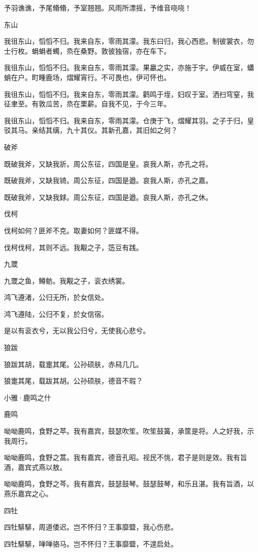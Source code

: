 予羽谯谯，予尾翛翛，予室翘翘。风雨所漂摇，予维音哓哓！

东山

我徂东山，慆慆不归。我来自东，零雨其濛。我东曰归，我心西悲。制彼裳衣，勿士行枚。蜎蜎者蠋，烝在桑野。敦彼独宿，亦在车下。

我徂东山，慆慆不归。我来自东，零雨其濛。果臝之实，亦施于宇。伊威在室，蠨蛸在户。町畽鹿场，熠耀宵行。不可畏也，伊可怀也。

我徂东山，慆慆不归。我来自东，零雨其濛。鹳鸣于垤，妇叹于室。洒扫穹窒，我征聿至。有敦瓜苦，烝在栗薪。自我不见，于今三年。

我徂东山，慆慆不归。我来自东，零雨其濛。仓庚于飞，熠耀其羽。之子于归，皇驳其马。亲结其缡，九十其仪。其新孔嘉，其旧如之何？

破斧

既破我斧，又缺我斨。周公东征，四国是皇。哀我人斯，亦孔之将。

既破我斧，又缺我锜。周公东征，四国是遒。哀我人斯，亦孔之嘉。

既破我斧，又缺我銶。周公东征，四国是遒。哀我人斯，亦孔之休。

伐柯

伐柯如何？匪斧不克。取妻如何？匪媒不得。

伐柯伐柯，其则不远。我觏之子，笾豆有践。

九罭

九罭之鱼，鳟鲂。我觏之子，衮衣绣裳。

鸿飞遵渚，公归无所，於女信处。

鸿飞遵陆，公归不复，於女信宿。

是以有衮衣兮，无以我公归兮，无使我心悲兮。

狼跋

狼跋其胡，载疐其尾。公孙硕肤，赤舄几几。

狼疐其尾，载跋其胡。公孙硕肤，德音不瑕？




小雅·鹿鸣之什


鹿鸣

呦呦鹿鸣，食野之苹。我有嘉宾，鼓瑟吹笙。吹笙鼓簧，承筐是将。人之好我，示我周行。

呦呦鹿鸣，食野之蒿。我有嘉宾，德音孔昭。视民不恌，君子是则是效。我有旨酒，嘉宾式燕以敖。

呦呦鹿鸣，食野之芩。我有嘉宾，鼓瑟鼓琴。鼓瑟鼓琴，和乐且湛。我有旨酒，以燕乐嘉宾之心。

四牡

四牡騑騑，周道倭迟。岂不怀归？王事靡盬，我心伤悲。

四牡騑騑，啴啴骆马。岂不怀归？王事靡盬，不遑启处。

